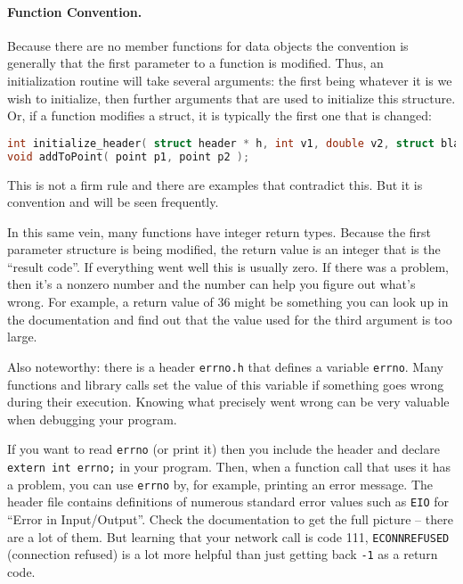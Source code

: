 \paragraph{Function Convention.}

Because there are no member functions for data objects the convention is generally that the first parameter to a function is modified. Thus, an initialization routine will take several arguments: the first being whatever it is we wish to initialize, then further arguments that are used to initialize this structure. Or, if a function modifies a struct, it is typically the first one that is changed:

\begin{lstlisting}[language=C]
int initialize_header( struct header * h, int v1, double v2, struct blah * v3 );
void addToPoint( point p1, point p2 );
\end{lstlisting}

This is not a firm rule and there are examples that contradict this. But it is convention and will be seen frequently.

In this same vein, many functions have integer return types. Because the first parameter structure is being modified, the return value is an integer that is the ``result code''. If everything went well this is usually zero. If there was a problem, then it's a nonzero number and the number can help you figure out what's wrong. For example, a return value of 36 might be something you can look up in the documentation and find out that the value used for the third argument is too large.

Also noteworthy: there is a header \texttt{errno.h} that defines a variable \texttt{errno}. Many functions and library calls set the value of this variable if something goes wrong during their execution. Knowing what precisely went wrong can be very valuable when debugging your program.

If you want to read \texttt{errno} (or print it) then you include the header and declare \texttt{extern int errno;}  in your program. Then, when a function call that uses it has a problem, you can use \texttt{errno} by, for example, printing an error message. The header file contains definitions of numerous standard error values such as \texttt{EIO} for ``Error in Input/Output''. Check the documentation to get the full picture -- there are a lot of them. But learning that your network call is code 111, \texttt{ECONNREFUSED} (connection refused) is a lot more helpful than just getting back \texttt{-1} as a return code.


